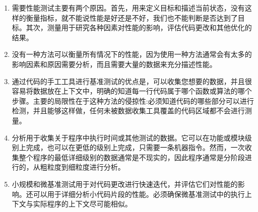 \begin{enumerate}
\item 
需要性能测试主要有两个原因。首先，用来定义目标和描述当前状态，没有这样的衡量指标，就不能说性能是好还是不好，我们也不能判断是否达到了目标。其次，测量用于研究各种因素对性能的影响，评估代码更改和其他优化的结果。

\item 
没有一种方法可以衡量所有情况下的性能，因为使用一种方法通常会有太多的影响因素和原因需要分析，而且需要大量的数据来充分描述性能。

\item 
通过代码的手工工具进行基准测试的优点是，可以收集您想要的数据，并且很容易将数据放在上下文中，明确的知道每一行代码属于哪个函数或算法的哪个步骤。主要的局限性在于这种方法的侵掠性:必须知道代码的哪些部分可以进行检测，并且能够这样做，任何未被数据收集工具覆盖的代码区域都不会进行测量。

\item
分析用于收集关于程序中执行时间或其他测试的数据。它可以在功能或模块级别上完成，也可以在更低的级别上完成，只需要一条机器指令。然而，一次收集整个程序的最低详细级别的数据通常是不现实的，因此程序通常是分阶段进行的，从粗粒度到细粒度进行分析。

\item
小规模和微基准测试用于对代码更改进行快速迭代，并评估它们对性能的影响。还可以用于详细分析小代码片段的性能。必须确保微基准测试中的执行上下文与实际程序的上下文尽可能相似。
	
\end{enumerate}